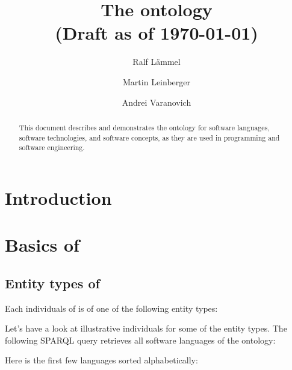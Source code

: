 \documentclass{llncs}
\title{The \solasote{} ontology\\
(Draft as of \today)}
\author{Ralf L\"ammel \and Martin Leinberger \and Andrei Varanovich}
\institute{Fachbereich Informatik, Universit\"at Koblenz-Landau, Germany}
\begin{document}
\maketitle

\begin{abstract}
  This document describes and demonstrates the \solasote{} ontology
  for software languages, software technologies, and software
  concepts, as they are used in programming and software engineering.
\end{abstract}


\section{Introduction}



\section{Basics of \solasote}

\subsection{Entity types of \solasote}

Each individuals of \solasote{} is of one of the following entity
types:





Let's have a look at illustrative individuals for some of the entity
types. The following SPARQL query retrieves all software languages of
the ontology:



\noindent
Here is the first few languages sorted alphabetically:

\end{document}
